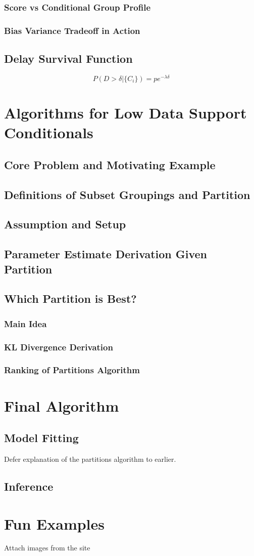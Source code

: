 \documentclass{article}
\begin{document}
\subsubsection{Score vs Conditional Group Profile}
\subsubsection{Bias Variance Tradeoff in Action}

\subsection{Delay Survival Function}
$$P(D>\delta | \{C_i\}) = p e^{-\lambda \delta}$$

\section{Algorithms for Low Data Support Conditionals}
\subsection{Core Problem and Motivating Example}
\subsection{Definitions of Subset Groupings and Partition}
\subsection{Assumption and Setup}
\subsection{Parameter Estimate Derivation Given Partition}
\subsection{Which Partition is Best?}
\subsubsection{Main Idea}
\subsubsection{KL Divergence Derivation}
\subsubsection{Ranking of Partitions Algorithm}

\section{Final Algorithm}
\subsection{Model Fitting}
Defer explanation of the partitions algorithm to earlier.
\subsection{Inference}

\section{Fun Examples}
Attach images from the site
\end{document}
